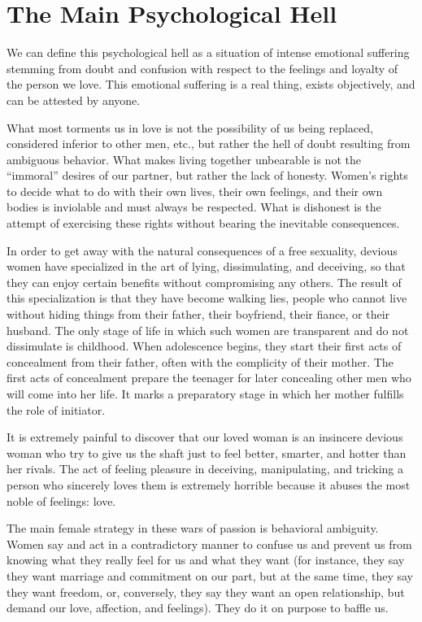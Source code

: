 \section{The Main Psychological Hell}

\par We can define this psychological hell as a situation of intense emotional suffering stemming from doubt and confusion with respect to the feelings and loyalty of the person we love. This emotional suffering is a real thing, exists objectively, and can be attested by anyone.

\par What most torments us in love is not the possibility of us being replaced, considered inferior to other men, etc., but rather the hell of doubt resulting from ambiguous behavior. What makes living together unbearable is not the \enquote{immoral} desires of our partner, but rather the lack of honesty. Women's rights to decide what to do with their own lives, their own feelings, and their own bodies is inviolable and must always be respected. What is dishonest is the attempt of exercising these rights without bearing the inevitable consequences.

\par In order to get away with the natural consequences of a free sexuality, devious women have specialized in the art of lying, dissimulating, and deceiving, so that they can enjoy certain benefits without compromising any others. The result of this specialization is that they have become walking lies, people who cannot live without hiding things from their father, their boyfriend, their fiance, or their husband. The only stage of life in which such women are transparent and do not dissimulate is childhood. When adolescence begins, they start their first acts of concealment from their father, often with the complicity of their mother. The first acts of concealment prepare the teenager for later concealing other men who will come into her life. It marks a preparatory stage in which her mother fulfills the role of initiator.

\par It is extremely painful to discover that our loved woman is an insincere devious woman who try to give us the shaft just to feel better, smarter, and hotter than her rivals. The act of feeling pleasure in deceiving, manipulating, and tricking a person who sincerely loves them is extremely horrible because it abuses the most noble of feelings: love.

\par The main female strategy in these wars of passion is behavioral ambiguity. Women say and act in a contradictory manner to confuse us and prevent us from knowing what they really feel for us and what they want (for instance, they say they want marriage and commitment on our part, but at the same time, they say they want freedom, or, conversely, they say they want an open relationship, but demand our love, affection, and feelings). They do it on purpose to baffle us.

